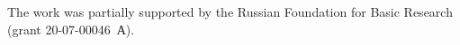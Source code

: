 



\vspace*{-14pt}

\Ack

\vspace*{-4pt}

\noindent
The work was partially supported by the Russian Foundation for Basic Research (grant 
20-07-00046~А).


  \begin{multicols}{2}

\renewcommand{\bibname}{\protect\rmfamily References}


\end{multicols}
